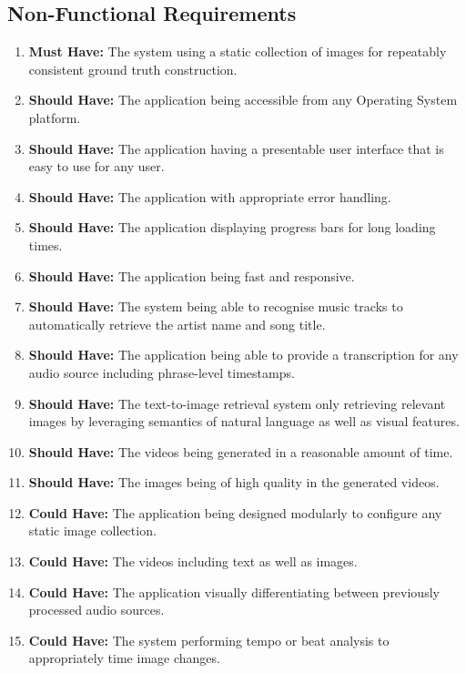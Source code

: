 \documentclass{l4proj}
\begin{document}
\subsection{Non-Functional Requirements}
\begin{enumerate}[resume]
    \item \label{req:18} \textbf{Must Have:} The system using a static collection of images for repeatably consistent ground truth construction.
    \item \label{req:19} \textbf{Should Have:} The application being accessible from any Operating System platform.
    \item \label{req:20} \textbf{Should Have:} The application having a presentable user interface that is easy to use for any user.
    \item \label{req:21} \textbf{Should Have:} The application with appropriate error handling.
    \item \label{req:22} \textbf{Should Have:} The application displaying progress bars for long loading times.
    \item \label{req:23} \textbf{Should Have:} The application being fast and responsive.
    \item \label{req:24} \textbf{Should Have:} The system being able to recognise music tracks to automatically retrieve the artist name and song title.
    \item \label{req:25} \textbf{Should Have:} The application being able to provide a transcription for any audio source including phrase-level timestamps.
    \item \label{req:26} \textbf{Should Have:} The text-to-image retrieval system only retrieving relevant images by leveraging semantics of natural language as well as visual features.
    \item \label{req:27} \textbf{Should Have:} The videos being generated in a reasonable amount of time.
    \item \label{req:28} \textbf{Should Have:} The images being of high quality in the generated videos.
    \item \label{req:29} \textbf{Could Have:} The application being designed modularly to configure any static image collection.
    \item \label{req:30} \textbf{Could Have:} The videos including text as well as images.
    \item \label{req:31} \textbf{Could Have:} The application visually differentiating between previously processed audio sources.
    \item \label{req:32} \textbf{Could Have:} The system performing tempo or beat analysis to appropriately time image changes.
    
\end{enumerate}
\end{document}
